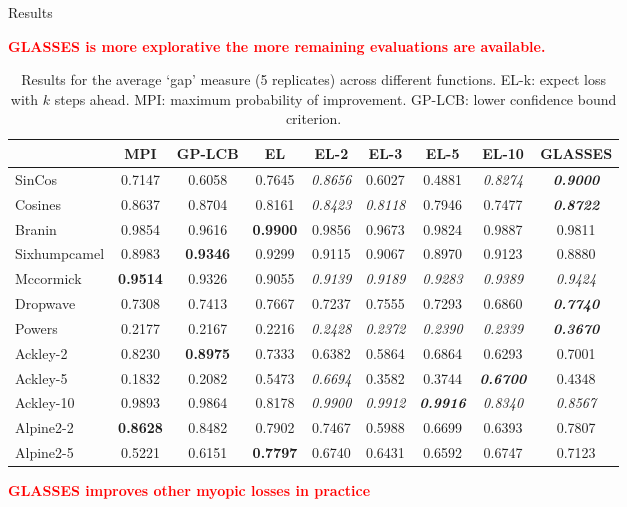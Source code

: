 \documentclass[15pt,serif,mathserif,final]{beamer}
\begin{document}
\begin{frame}{}
\begin{columns}[t]
\begin{column}{0.32\linewidth}
\begin{block}{Results}
 \begin{center}
 \textcolor{red}{\textbf{GLASSES is more explorative the more remaining evaluations are available.}}
 \end{center}
 

\begin{table}[t!]
\begin{center}
\begin{tabular}{lcccccccc}
\hline
{} &     MPI &     GP-LCB &      EL &    EL-2 &    EL-3 &    EL-5 &  EL-10 &    GLASSES \\
\hline
SinCos  &  0.7147 &  0.6058 &  0.7645 &  \emph{0.8656} &  0.6027 &  0.4881 &  \emph{0.8274} &  \emph{\textbf{0.9000}} \\ 
Cosines           &  0.8637 &  0.8704 &  0.8161 &  \emph{0.8423} &  \emph{0.8118} &  0.7946 &  0.7477 &  \emph{\textbf{0.8722}} \\
Branin              &  0.9854 &  0.9616 &  \textbf{0.9900} &  0.9856 &  0.9673 &  0.9824 &  0.9887 &  0.9811 \\
Sixhumpcamel        &  0.8983 &  \textbf{0.9346} &  0.9299 &  0.9115 &  0.9067 &  0.8970 &  0.9123 &  0.8880 \\
Mccormick           & \textbf{0.9514} &  0.9326 &  0.9055 &  \emph{0.9139} &  \emph{0.9189} &  \emph{0.9283} &  \emph{0.9389} &  \emph{0.9424} \\
Dropwave            &  0.7308 &  0.7413 &  0.7667 &  0.7237 &  0.7555 &  0.7293 &  0.6860 &  \emph{\textbf{0.7740}} \\
Powers              &  0.2177 &  0.2167 &  0.2216 &  \emph{0.2428} &  \emph{0.2372} &  \emph{0.2390} &  \emph{0.2339} &  \emph{\textbf{0.3670}} \\
Ackley-2 &  0.8230 &  \textbf{0.8975} &  0.7333 &  0.6382 &  0.5864 &  0.6864 &  0.6293 &  0.7001 \\
Ackley-5  & 0.1832&   0.2082&   0.5473&   \emph{0.6694}&  0.3582&   0.3744&   \emph{\textbf{0.6700}} &  0.4348\\ 
Ackley-10 &  0.9893 &  0.9864 &  0.8178 &   \emph{0.9900} &   \emph{0.9912} &   \emph{\textbf{0.9916}} &   \emph{0.8340} &   \emph{0.8567} \\
Alpine2-2 &  \textbf{0.8628} &  0.8482 &  0.7902 &  0.7467 &  0.5988 &  0.6699 &  0.6393 &  0.7807 \\
Alpine2-5  &  0.5221 &  0.6151 &  \textbf{0.7797} &  0.6740 &  0.6431 &  0.6592 &  0.6747 &  0.7123 \\
\hline
\end{tabular}\caption{Results for the average `gap' measure (5 replicates) across different functions.  EL-k: expect loss with $k$ steps ahead. MPI: maximum probability of improvement. GP-LCB: lower confidence bound criterion. }
\end{center}
\end{table}
 \begin{center}
 \textcolor{red}{\textbf{GLASSES improves other myopic losses in practice }}
 \end{center}
 


\end{block}
\end{column}
\end{columns}
\end{frame}
\end{document}
